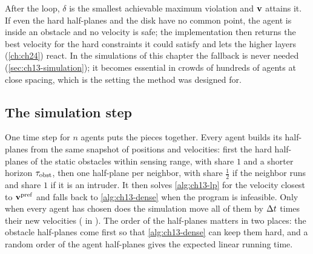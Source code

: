 \begin{algorithm}[htb]
\caption{Dense fallback: minimize the largest violation when the half-planes do not intersect}
\label{alg:ch13-dense}
\end{algorithm}

After the loop, $\delta$ is the smallest achievable maximum violation and
$\mathbf{v}$ attains it. If even the hard half-planes and the disk have no common
point, the agent is inside an obstacle and no velocity is safe; the
implementation then returns the best velocity for the hard constraints it
could satisfy and lets the higher layers (\cref{ch:ch24}) react. In the
simulations of this chapter the fallback is never needed
(\cref{sec:ch13-simulation}); it becomes essential in crowds of hundreds of
agents at close spacing, which is the setting the method was designed for.

\subsection{The simulation step}
\label{sec:ch13-step}

One time step for $n$ agents puts the pieces together. Every agent builds
its half-planes from the same snapshot of positions and velocities: first
the hard half-planes of the static obstacles within sensing range, with
share $1$ and a shorter horizon $\tau_{\mathrm{obst}}$, then one half-plane
per neighbor, with share $\tfrac12$ if the neighbor runs \orca and share
$1$ if it is an intruder. It then solves \cref{alg:ch13-lp} for the velocity
closest to $\mathbf{v}^{\mathrm{pref}}$ and falls back to \cref{alg:ch13-dense}
when the program is infeasible. Only when every agent has chosen does the
simulation move all of them by $\Delta t$ times their new velocities
( in ). The order of the half-planes
matters in two places: the obstacle half-planes come first so that
\cref{alg:ch13-dense} can keep them hard, and a random order of the agent
half-planes gives the expected linear running time.

